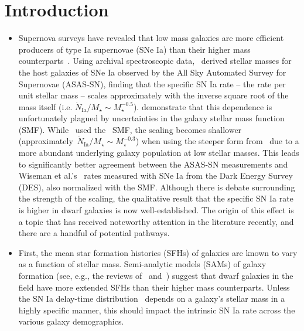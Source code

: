 \documentclass[ms.tex]{subfiles}
\begin{document}
\section{Introduction}
\label{sec:intro}

\begin{itemize}

	\item Supernova surveys have revealed that low mass galaxies are
	more efficient producers of type Ia supernovae (SNe Ia) than their higher
	mass counterparts~\citep[e.g.][]{Mannucci2005}.
	Using archival spectroscopic data,~\citet{Brown2019} derived stellar
	masses for the host galaxies of SNe Ia observed by the All Sky
	Automated Survey for Supernovae (ASAS-SN), finding that the specific SN
	Ia rate -- the rate per unit stellar mass -- scales approximately with
	the inverse square root of the mass itself (i.e.
	$\dot{N}_\text{Ia} / M_\star \sim M_\star^{-0.5}$).
	\citet{Gandhi2022} demonstrate that this dependence is unfortunately
	plagued by uncertainties in the galaxy stellar mass function (SMF).
	While~\citet{Brown2019} used the~\citet{Bell2003} SMF, the scaling becomes
	shallower (approximately~$\dot{N}_\text{Ia} / M_\star \sim M_\star^{-0.3}$)
	when using the steeper form from~\citet{Baldry2012} due to a more abundant
	underlying galaxy population at low stellar masses.
	This leads to significantly better agreement between the ASAS-SN
	measurements and Wiseman et al.'s~\citeyearpar{Wiseman2021} rates measured
	with SNe Ia from the Dark Energy Survey (DES), also normalized with the
	\citet{Baldry2012} SMF.
	Although there is debate surrounding the strength of the scaling, the
	qualitative result that the specific SN Ia rate is higher in dwarf galaxies
	is now well-established.
	The origin of this effect is a topic that has received noteworthy attention
	in the literature recently, and there are a handful of potential pathways.

	\item First, the mean star formation histories (SFHs) of galaxies are known
	to vary as a function of stellar mass.
	Semi-analytic models (SAMs) of galaxy formation (see, e.g., the
	reviews of~\citealp{Baugh2006} and~\citealp*{Somerville2015a}) suggest that
	dwarf galaxies in the field have more extended SFHs than their higher mass
	counterparts.
	Unless the SN Ia delay-time distribution~\citep[DTD; e.g.][]{Maoz2012a}
	depends on a galaxy's stellar mass in a highly specific manner, this should
	impact the intrinsic SN Ia rate across the various galaxy demographics.


\end{itemize}
\end{document}
